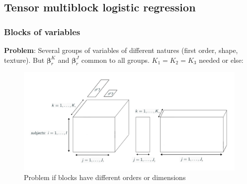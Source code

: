 \documentclass{beamer}
\begin{document}
\subsection{Tensor multiblock logistic regression}
\begin{frame}
 \frametitle{Blocks of variables}

 \textbf{Problem}: Several groups of variables of different natures (first order, shape, texture). But $\bm{\beta}_r^{K}$ and $\bm{\beta}_r^J$ common to all groups. $K_1 = K_2 = K_3$ needed or else:

 \begin{figure}
    \centering
    \includegraphics[scale = 0.23]{images/blocks_faux.png}
    \caption{Problem if blocks have different orders or dimensions}
\end{figure}

\end{frame}

\end{document}
